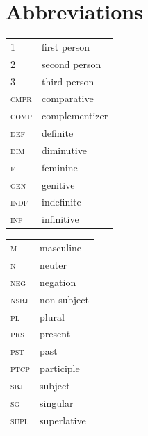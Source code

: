 \documentclass[output=paper,colorlinks,citecolor=brown]{langscibook}
\begin{document}
\section*{Abbreviations}
\begin{tabularx}{.45\textwidth}{lQ}
 \scshape 1 & first person \\
 \scshape 2 & second person \\
 \scshape 3 & third person \\
 \scshape cmpr & comparative \\
 \scshape comp & complementizer \\
 \scshape def & definite \\
 \scshape dim & diminutive \\
 \scshape f & feminine \\
 \scshape gen & genitive \\
 \scshape indf & indefinite \\
 \scshape inf & infinitive \\
\end{tabularx}
\begin{tabularx}{.45\textwidth}{lQ}
 \scshape m & masculine \\
 \scshape n & neuter \\
 \scshape neg & negation \\
 \scshape nsbj & non-subject \\
 \scshape pl & plural \\
 \scshape prs & present \\
 \scshape pst & past \\
 \scshape ptcp & participle \\
 \scshape sbj & subject \\
 \scshape sg & singular \\
 \scshape supl & superlative \\
\end{tabularx}


\sloppy\printbibliography[heading=subbibliography,notkeyword=this]
\end{document}
